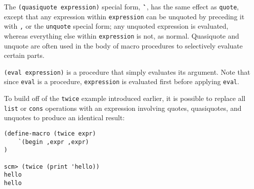 The \texttt{(quasiquote expression)} special form, \textbf{\`}, has the same effect as \texttt{quote}, except that any expression within \texttt{expression} can be unquoted by preceding it with \texttt{,} or the \texttt{unquote} special form; any unquoted expression is evaluated, whereas everything else within \texttt{expression} is not, as normal. Quasiquote and unquote are often used in the body of macro procedures to selectively evaluate certain parts. 

\texttt{(eval expression)} is a procedure that simply evaluates its argument. Note that since \texttt{eval} is a procedure, \texttt{expression} is evaluated first before applying \texttt{eval}.

To build off of the \texttt{twice} example introduced earlier, it is possible to replace all \texttt{list} or \texttt{cons} operations with an expression involving quotes, quasiquotes, and unquotes to produce an identical result:

\begin{lstlisting}
(define-macro (twice expr)
    `(begin ,expr ,expr)
)
    
scm> (twice (print 'hello))
hello
hello
\end{lstlisting}


